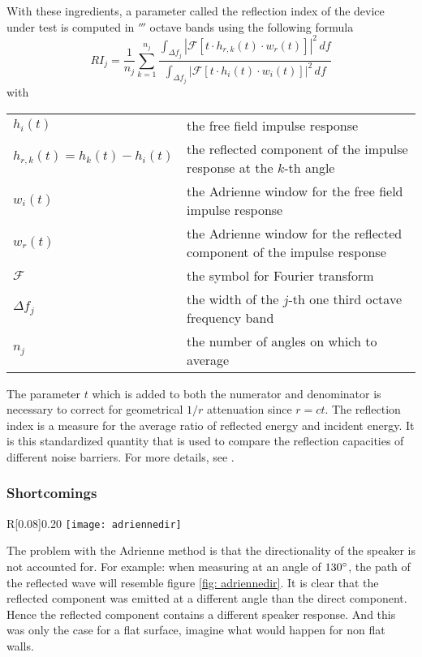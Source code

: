 With these ingredients, a parameter called the reflection index of the device under test is computed in $\third$ octave bands using the following formula
\begin{equation}
RI_j = \frac{1}{n_j} \sum^{n_j}_{k=1} \frac{\int_{\Delta f_j} \left|\mathcal{F}\left[t\cdot h_{r,k}(t)\cdot w_r(t)\right]\right|^2 \,df }{\int_{\Delta f_j} \left|\mathcal{F}\left[t \cdot h_{i}(t) \cdot w_i(t)\right]\right|^2 \,df }
\label{RI}
\end{equation}
with \\

\begin{tabular}{ll}
$h_i(t)$ & the free field impulse response \\
$h_{r,k}(t) = h_k(t) - h_i(t)$ & the reflected component of the impulse response at the $k$-th angle \\
$w_i(t)$ & the Adrienne window for the free field impulse response\\ 
$w_r(t)$ & the Adrienne window for the reflected component of the impulse response\\ 
$\mathcal{F}$ & the symbol for Fourier transform \\
$\Delta f_j$ & the width of the $j$-th one third octave frequency band\\
$n_j$ & the number of angles on which to average\\ 
\end{tabular}

The parameter $t$ which is added to both the numerator and denominator is necessary to correct for geometrical $1/r$ attenuation since $r =c t$. 
The reflection index is a measure for the average ratio of reflected energy and incident energy. It is this standardized quantity that is used to compare the reflection capacities of different noise barriers. For more details, see \cite{Adrienne}.

\subsubsection{Shortcomings}
\begin{wrapfigure}{R}[0.08\textwidth]{0.20\textwidth}
	\vspace{-10pt}
  \centering
    \texttt{[image: adriennedir]}
  \caption{Path of the reflected wave.}
  \label{fig: adriennedir}
\end{wrapfigure}
The problem with the Adrienne method is that the directionality of the speaker is not accounted for. For example: when measuring at an angle of $130^{\circ}$, the path of the reflected wave will resemble figure \ref{fig: adriennedir}. It is clear that the reflected component was emitted at a different angle than the direct component. Hence the reflected component contains a different speaker response. And this was only the case for a flat surface, imagine what would happen for non flat walls.

